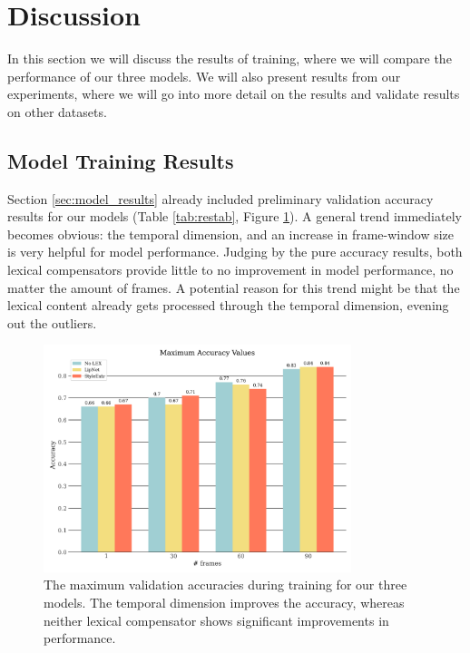 \section{Discussion}
\label{sec:discussion}
In this section we will discuss the results of training, where we will compare the performance of our three models. We will also present results from our experiments, where we will go into more detail on the results and validate results on other datasets.
\subsection{Model Training Results}
Section \ref{sec:model_results} already included preliminary validation accuracy results for our models (Table \ref{tab:restab}, Figure \ref{fig:max_acc}). A general trend immediately becomes obvious: the temporal dimension, and an increase in frame-window size is very helpful for model performance. Judging by the pure accuracy results, both lexical compensators provide little to no improvement in model performance, no matter the amount of frames. A potential reason for this trend might be that the lexical content already gets processed through the temporal dimension, evening out the outliers.

\begin{figure}
    \centering
    \includegraphics[width=0.8\textwidth]{res/maxaccvalues.png}
    \caption{The maximum validation accuracies during training for our three models. The temporal dimension improves the accuracy, whereas neither lexical compensator shows significant improvements in performance.}
    \label{fig:max_acc}
\end{figure}

